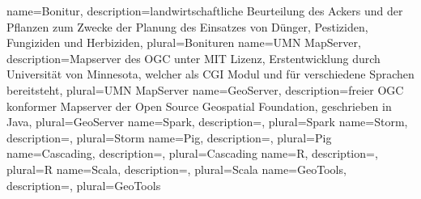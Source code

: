 {
  name=Bonitur,
  description={landwirtschaftliche Beurteilung des Ackers und der Pflanzen zum Zwecke der Planung des Einsatzes von Dünger, Pestiziden, Fungiziden und Herbiziden},
  plural=Bonituren
}
{
  name=UMN MapServer,
  description={Mapserver des OGC unter MIT Lizenz, Erstentwicklung durch Universität von Minnesota, welcher als CGI Modul und für verschiedene Sprachen  bereitsteht},
  plural=UMN MapServer
}
{
  name=GeoServer,
  description={freier OGC konformer Mapserver der Open Source Geospatial Foundation, geschrieben in Java},
  plural=GeoServer
}
{
  name=Spark,
  description={},
  plural=Spark
}
{
  name=Storm,
  description={},
  plural=Storm
}
{
  name=Pig,
  description={},
  plural=Pig
}
{
  name=Cascading,
  description={},
  plural=Cascading
}
{
  name=R,
  description={},
  plural=R
}
{
  name=Scala,
  description={},
  plural=Scala
}
{
  name=GeoTools,
  description={},
  plural=GeoTools
}